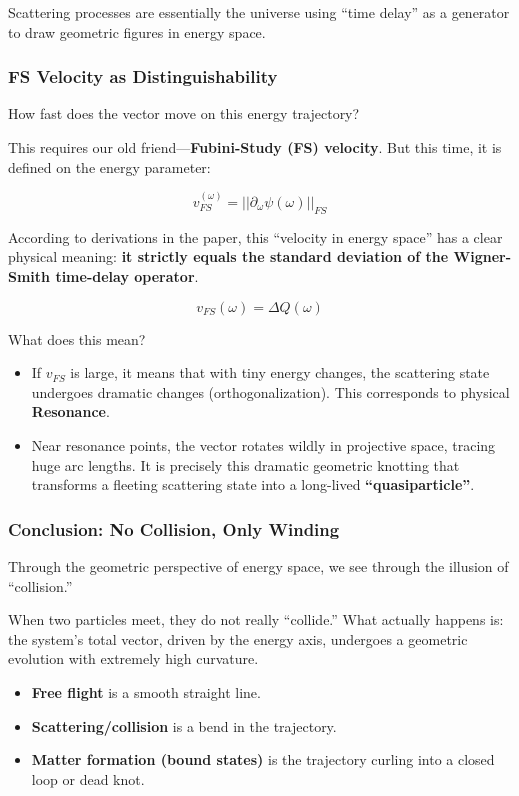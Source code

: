 Scattering processes are essentially the universe using ``time delay'' as a generator to draw geometric figures in energy space.

\subsubsection{FS Velocity as Distinguishability}

How fast does the vector move on this energy trajectory?

This requires our old friend---\textbf{Fubini-Study (FS) velocity}. But this time, it is defined on the energy parameter:

\[v_{FS}^{(\omega)} = ||\partial_\omega \psi(\omega)||_{FS}\]

According to derivations in the paper, this ``velocity in energy space'' has a clear physical meaning: \textbf{it strictly equals the standard deviation of the Wigner-Smith time-delay operator}.

\[v_{FS}(\omega) = \Delta Q(\omega)\]

What does this mean?

\begin{itemize}
\item If $v_{FS}$ is large, it means that with tiny energy changes, the scattering state undergoes dramatic changes (orthogonalization). This corresponds to physical \textbf{Resonance}.

\item Near resonance points, the vector rotates wildly in projective space, tracing huge arc lengths. It is precisely this dramatic geometric knotting that transforms a fleeting scattering state into a long-lived \textbf{``quasiparticle''}.
\end{itemize}

\subsubsection{Conclusion: No Collision, Only Winding}

Through the geometric perspective of energy space, we see through the illusion of ``collision.''

When two particles meet, they do not really ``collide.'' What actually happens is: the system's total vector, driven by the energy axis, undergoes a geometric evolution with extremely high curvature.

\begin{itemize}
\item \textbf{Free flight} is a smooth straight line.

\item \textbf{Scattering/collision} is a bend in the trajectory.

\item \textbf{Matter formation (bound states)} is the trajectory curling into a closed loop or dead knot.
\end{itemize}


